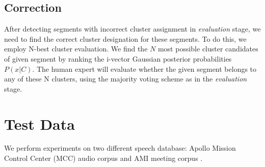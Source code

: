 \documentclass[journal,10pt]{IEEEtran}
\begin{document}
\subsection{Correction}
After detecting segments with incorrect cluster assignment in \textit{evaluation} stage, we need to find the correct cluster designation for these segments. To do this, we employ N-best cluster evaluation.
We find the $N$ most possible cluster candidates of given segment by ranking the i-vector Gaussian posterior probabilities $P(x|C)$. The human expert will evaluate whether the given segment belongs to any of these N clusters, using the majority voting scheme as in the \textit{evaluation} stage. 

\section{Test Data}
We perform experiments on two different speech database: Apollo Mission Control Center (MCC) audio  corpus and AMI meeting corpus \cite{mccowan2005ami}. 
\end{document}
